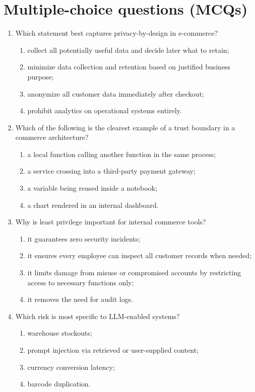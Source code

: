 \section{Multiple-choice questions (MCQs)}
\begin{enumerate}
  \item Which statement best captures privacy-by-design in e-commerce?
  \begin{enumerate}
    \item collect all potentially useful data and decide later what to retain;
    \item minimize data collection and retention based on justified business purpose;
    \item anonymize all customer data immediately after checkout;
    \item prohibit analytics on operational systems entirely.
  \end{enumerate}

  \item Which of the following is the clearest example of a trust boundary in a commerce architecture?
  \begin{enumerate}
    \item a local function calling another function in the same process;
    \item a service crossing into a third-party payment gateway;
    \item a variable being reused inside a notebook;
    \item a chart rendered in an internal dashboard.
  \end{enumerate}

  \item Why is least privilege important for internal commerce tools?
  \begin{enumerate}
    \item it guarantees zero security incidents;
    \item it ensures every employee can inspect all customer records when needed;
    \item it limits damage from misuse or compromised accounts by restricting access to necessary functions only;
    \item it removes the need for audit logs.
  \end{enumerate}

  \item Which risk is most specific to LLM-enabled systems?
  \begin{enumerate}
    \item warehouse stockouts;
    \item prompt injection via retrieved or user-supplied content;
    \item currency conversion latency;
    \item barcode duplication.
  \end{enumerate}


\end{enumerate}
